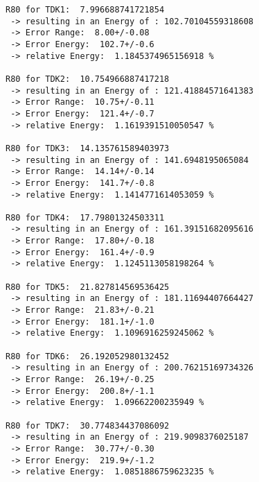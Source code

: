 \begin{verbatim}
R80 for TDK1:  7.996688741721854 
 -> resulting in an Energy of : 102.70104559318608
 -> Error Range:  8.00+/-0.08
 -> Error Energy:  102.7+/-0.6
 -> relative Energy:  1.1845374965156918 % 

R80 for TDK2:  10.754966887417218 
 -> resulting in an Energy of : 121.41884571641383
 -> Error Range:  10.75+/-0.11
 -> Error Energy:  121.4+/-0.7
 -> relative Energy:  1.1619391510050547 % 

R80 for TDK3:  14.135761589403973 
 -> resulting in an Energy of : 141.6948195065084
 -> Error Range:  14.14+/-0.14
 -> Error Energy:  141.7+/-0.8
 -> relative Energy:  1.1414771614053059 % 

R80 for TDK4:  17.79801324503311 
 -> resulting in an Energy of : 161.39151682095616
 -> Error Range:  17.80+/-0.18
 -> Error Energy:  161.4+/-0.9
 -> relative Energy:  1.1245113058198264 % 

R80 for TDK5:  21.827814569536425 
 -> resulting in an Energy of : 181.11694407664427
 -> Error Range:  21.83+/-0.21
 -> Error Energy:  181.1+/-1.0
 -> relative Energy:  1.1096916259245062 % 

R80 for TDK6:  26.192052980132452 
 -> resulting in an Energy of : 200.76215169734326
 -> Error Range:  26.19+/-0.25
 -> Error Energy:  200.8+/-1.1
 -> relative Energy:  1.09662200235949 % 

R80 for TDK7:  30.774834437086092 
 -> resulting in an Energy of : 219.9098376025187
 -> Error Range:  30.77+/-0.30
 -> Error Energy:  219.9+/-1.2
 -> relative Energy:  1.0851886759623235 % 
\end{verbatim}